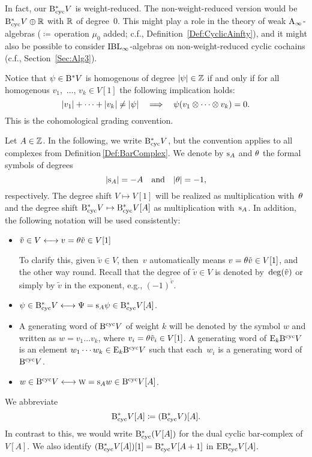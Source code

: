 \documentclass[\MainFolder/Text.tex]{subfiles}
\begin{document}
\begin{Remark}\label{Rem:NWG}
In fact, our $\mathrm{B}_{\mathrm{cyc}}^* V$ is weight-reduced. The non-weight-reduced version would be $\mathrm{B}_{\mathrm{cyc}}^* V \oplus \mathbb{R}$ with $\mathbb{R}$ of degree~$0$. This might play a role in the theory of  weak $\mathrm{A}_\infty$-algebras ($\coloneqq$\,operation $\mu_0$ added; c.f., Definition~\ref{Def:CyclicAinfty}), and it might also be possible to consider $\mathrm{IBL}_\infty$-algebras on non-weight-reduced cyclic cochains (c.f., Section~\ref{Sec:Alg3}).
\end{Remark}

Notice that $\psi \in \mathrm{B}^* V$ is homogenous of degree $|\psi|\in \mathbb{Z}$ if and only if for all homogenous $v_1$,~$\dotsc$, $v_k \in V[1]$ the following implication holds:
\begin{equation*}
|v_1| + \dotsb + |v_k| \neq |\psi|\quad\Longrightarrow\quad \psi(v_1\otimes \dotsb \otimes v_k) = 0.
\end{equation*}
This is the cohomological grading convention.

\begin{Notation} \label{Def:Notation}
Let $A\in \mathbb{Z}$. In the following, we write $\mathrm{B}_{\mathrm{cyc}}^* V$, but the convention applies to all complexes from Definition\,\ref{Def:BarComplex}. We denote by $\mathrm{s}_A$ and $\theta$ the formal symbols of degrees 
$$ |\mathrm{s}_A| = -A \quad \text{and}\quad|\theta| = -1, $$
respectively. The degree shift $V \mapsto V[1]$ will be realized as  multiplication with~$\theta$ and the degree shift $\mathrm{B}_{\mathrm{cyc}}^* V\mapsto \mathrm{B}_{\mathrm{cyc}}^* V[A]$ as multiplication with~$\mathrm{s}_A$. In addition, the following notation will be used consistently:
\begin{itemize}
 \item $\tilde{v}\in V \longleftrightarrow v = \theta \tilde{v} \in V[1]$
 
  To clarify this, given $\tilde{v} \in V$, then~$v$ automatically means $v = \theta \tilde{v} \in V[1]$, and the other way round. Recall that the degree of $\tilde{v}\in V$ is denoted by~$\operatorname{deg}(\tilde{v})$ or simply by $\tilde{v}$ in the exponent, e.g., $(-1)^{\tilde{v}}$.
 \item  $\psi\in\mathrm{B}_{\mathrm{cyc}}^* V\longleftrightarrow \Psi = \mathrm{s}_A \psi\in \mathrm{B}_{\mathrm{cyc}}^* V[A]$.
 \item A generating word of $\mathrm{B}^{\mathrm{cyc}} V$ of weight $k$ will be denoted by the symbol $w$ and written as $w= v_1 \dots v_k$, where $v_i = \theta \tilde{v}_i \in V[1]$. A generating word of $\mathrm{E}_k \mathrm{B}^{\mathrm{cyc}} V$ is an element $w_1 \dotsb w_k \in \mathrm{E}_k \mathrm{B}^{\mathrm{cyc}} V$ such that each~$w_i$ is a generating word of $\mathrm{B}^{\mathrm{cyc}} V$.
 \item $w\in \mathrm{B}^{\mathrm{cyc}} V\longleftrightarrow \text{\footnotesize W} = \mathrm{s}_A w \in \mathrm{B}^{\mathrm{cyc}} V[A]$.
\end{itemize}
We abbreviate
$$ \mathrm{B}_{\mathrm{cyc}}^* V[A]\coloneqq (\mathrm{B}_{\mathrm{cyc}}^* V)[A]. $$
In contrast to this, we would write $\mathrm{B}_{\mathrm{cyc}}^*(V[A])$ for the dual cyclic bar-complex of~$V[A]$. We also identify $(\mathrm{B}_{\mathrm{cyc}}^* V[A])[1] = \mathrm{B}_{\mathrm{cyc}}^* V[A+1]$ in $\mathrm{E} \mathrm{B}_{\mathrm{cyc}}^* V[A]$.
\end{Notation}
\end{document}
